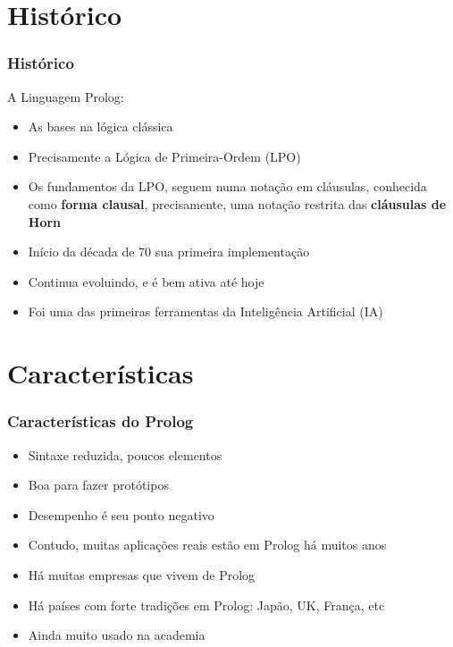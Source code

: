 \documentclass[sans]{beamer}
\begin{document}

\section{Histórico}
\begin{frame}[fragile]   %
\frametitle{Histórico}
\begin{block}{A Linguagem Prolog:}

\begin{itemize}
\itemsep 17pt

  \item As bases na lógica clássica
  \item Precisamente a Lógica de Primeira-Ordem (LPO)
  \item Os fundamentos da LPO,
seguem numa notação em cláusulas, conhecida como  \textbf{forma clausal}, 
precisamente, uma notação restrita das \textbf{cláusulas de Horn}
  \item Início da década de 70 sua primeira implementação
  \item Continua evoluindo, e é bem ativa até hoje
  \item Foi uma das primeiras ferramentas da Inteligência Artificial (IA)
\end{itemize}
\end{block}   
\end{frame} 



\section{Características}
\begin{frame}[fragile]   %
\frametitle{Características do Prolog}
\begin{block}{}
\begin{itemize}
\itemsep 17pt

  \item  Sintaxe reduzida, poucos elementos
  \item  Boa para fazer protótipos
  \item  Desempenho é seu ponto negativo
  \item  Contudo, muitas aplicações reais estão em Prolog há muitos anos
  \item  Há muitas empresas que vivem de Prolog
  \item  Há países com forte tradições em Prolog: Japão, UK, França, etc
  \item  Ainda muito usado na academia
  
\end{itemize}
\end{block}   
\end{frame} 
\end{document}
